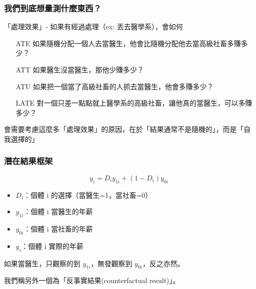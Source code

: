 \begin{frame}
    \frametitle{我們到底想量測什麼東西？}

    「處理效果」- 如果有經過處理（ex: 丟去醫學系），會如何
    \begin{enumerate}
        \item[ATE] 如果隨機分配一個人去當醫生，他會比隨機分配他去當高級社畜多賺多少？
        \item[ATT] 如果醫生沒當醫生，那他少賺多少？
        \item[ATU] 如果把一個當了高級社畜的人抓去當醫生，他會多賺多少？
        \item[LATE] 對一個只差一點點就上醫學系的高級社畜，讓他真的當醫生，可以多賺多少？
    \end{enumerate}
    \pause
    會需要考慮這麼多「處理效果」的原因，在於「結果通常不是隨機的」，而是「自我選擇的」
\end{frame}

\begin{frame}
    \frametitle{潛在結果框架}
    \begin{equation}
        y_i = D_i y_{1i} + (1-D_i) y_{0i}
    \end{equation}
    \pause
    \begin{itemize}
        \item $D_i$：個體 i 的選擇（當醫生=1，當社畜=0）
        \item $y_{1i}$：個體 i 當醫生的年薪
        \item $y_{0i}$：個體 i 當社畜的年薪
        \item $y_{i}$：個體 i 實際的年薪
    \end{itemize}
    \pause
    如果當醫生，只觀察的到 $y_{1i}$，無發觀察到 $y_{0i}$，反之亦然。
    
    我們稱另外一個為「反事實結果(counterfactual result)」。

\end{frame}


